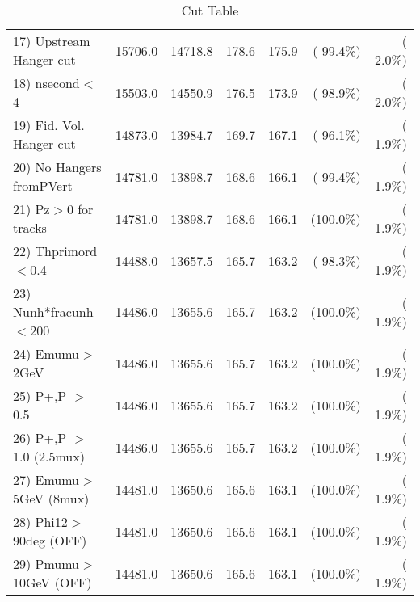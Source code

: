 \begin{table}[h!]
\begin{tabular}{||l||r|r|r|r|r|r||}
 17) Upstream Hanger cut  &      15706.0 &      14718.8 &        178.6 &        175.9 & ( 99.4\%) & (  2.0\%) \\
 18) nsecond$<$4          &      15503.0 &      14550.9 &        176.5 &        173.9 & ( 98.9\%) & (  2.0\%) \\
 19) Fid. Vol. Hanger cut &      14873.0 &      13984.7 &        169.7 &        167.1 & ( 96.1\%) & (  1.9\%) \\
 20) No Hangers fromPVert &      14781.0 &      13898.7 &        168.6 &        166.1 & ( 99.4\%) & (  1.9\%) \\
 21) Pz$>$0 for tracks    &      14781.0 &      13898.7 &        168.6 &        166.1 & (100.0\%) & (  1.9\%) \\
 22) Thprimord$<$0.4      &      14488.0 &      13657.5 &        165.7 &        163.2 & ( 98.3\%) & (  1.9\%) \\
 23) Nunh*fracunh$<$200   &      14486.0 &      13655.6 &        165.7 &        163.2 & (100.0\%) & (  1.9\%) \\
 24) Emumu$>$2GeV         &      14486.0 &      13655.6 &        165.7 &        163.2 & (100.0\%) & (  1.9\%) \\
 25) P+,P-$>$0.5          &      14486.0 &      13655.6 &        165.7 &        163.2 & (100.0\%) & (  1.9\%) \\
 26) P+,P-$>$1.0 (2.5mux) &      14486.0 &      13655.6 &        165.7 &        163.2 & (100.0\%) & (  1.9\%) \\
 27) Emumu$>$5GeV  (8mux) &      14481.0 &      13650.6 &        165.6 &        163.1 & (100.0\%) & (  1.9\%) \\
 28) Phi12$>$90deg  (OFF) &      14481.0 &      13650.6 &        165.6 &        163.1 & (100.0\%) & (  1.9\%) \\
 29) Pmumu$>$10GeV  (OFF) &      14481.0 &      13650.6 &        165.6 &        163.1 & (100.0\%) & (  1.9\%) \\
 \hline
 \hline
 \end{tabular}
 \caption{Cut Table           }
 \label{tab-cutcohjpsi-mumu_cohpip}
 \end{table}
